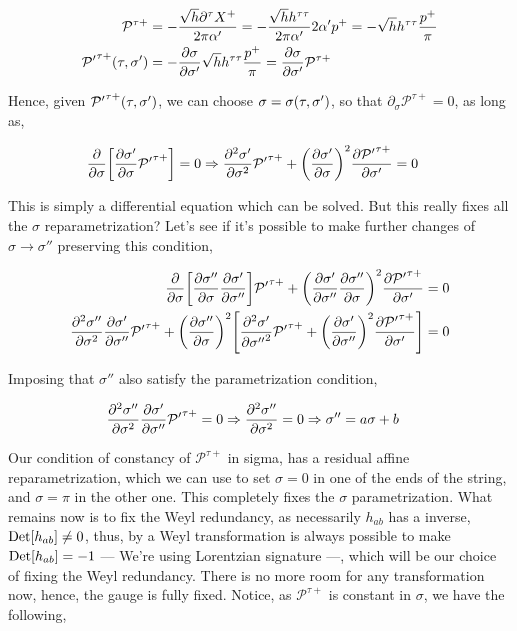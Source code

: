 \begin{align*}
    \mathcal P^{\tau+}&=-\frac{\sqrt h\partial^\tau X^+}{2\pi\alpha'}=-\frac{\sqrt h h^{\tau\tau}}{2\pi\alpha'}2\alpha'p^+=-\sqrt h h^{\tau\tau}\frac{p^+}{\pi}\\
    {\mathcal P'}^{\tau+}\qty(\tau,\sigma')&=-\pdv{\sigma}{\sigma'}\sqrt h h^{\tau\tau}\frac{p^+}{\pi}=\pdv{\sigma}{\sigma'}\mathcal P^{\tau+}
\end{align*}

Hence, given ${\mathcal P'}^{\tau+}\qty(\tau,\sigma')$, we can choose $\sigma=\sigma\qty(\tau,\sigma')$, so that $\partial_\sigma\mathcal P^{\tau+}=0$, as long as,

\begin{align*}
    \pdv{}{\sigma}\qty[{\pdv{\sigma'}{\sigma}}{\mathcal P'}^{\tau+}]&=0\Rightarrow{\pdv[2]{\sigma'}{\sigma}}{\mathcal P'}^{\tau+}+\qty(\pdv{\sigma'}{\sigma})^2\pdv{{\mathcal P'}^{\tau+}}{\sigma'}=0
\end{align*}

This is simply a differential equation which can be solved. But this really fixes all the $\sigma$ reparametrization? Let's see if it's possible to 
make further changes of $\sigma\rightarrow \sigma''$ preserving this condition,

\begin{align*}
    {\pdv{}{\sigma}}\qty[{\pdv{\sigma''}{\sigma}}{\pdv{\sigma'}{\sigma''}}]{\mathcal P'}^{\tau+}+\qty(\pdv{\sigma'}{\sigma''}\pdv{\sigma''}{\sigma})^2\pdv{{\mathcal P'}^{\tau+}}{\sigma'}&=0\\
    {\pdv[2]{\sigma''}{\sigma}}{\pdv{\sigma'}{\sigma''}}{\mathcal P'}^{\tau+}+\qty(\pdv{\sigma''}{\sigma})^2\qty[{\pdv[2]{{\sigma'}}{{\sigma''}}}{\mathcal P'}^{\tau+}
    +\qty(\pdv{\sigma'}{\sigma''})^2\pdv{{\mathcal P'}^{\tau+}}{\sigma'}
    ]&=0
\end{align*}

Imposing that $\sigma''$ also satisfy the parametrization condition,

\begin{align*}
    {\pdv[2]{\sigma''}{\sigma}}{\pdv{\sigma'}{\sigma''}}{\mathcal P'}^{\tau+}&=0\Rightarrow {\pdv[2]{\sigma''}{\sigma}}=0\Rightarrow \sigma''=a\sigma+b
\end{align*}

Our condition of constancy of $\mathcal P^{\tau+}$ in sigma, has a residual affine reparametrization, which we can use to set $\sigma=0$ in one of the ends of the 
string, and $\sigma=\pi$ in the other one. This completely fixes the $\sigma$ parametrization. What remains now is to fix the Weyl redundancy, as necessarily 
$h_{ab}$ has a inverse, $\textup{Det} \qty[h_{ab}]\neq 0$, thus, by a Weyl transformation is always possible to make $\textup{Det} \qty[h_{ab}]=-1$ --- We're using Lorentzian signature ---, which 
will be our choice of fixing the Weyl redundancy. There is 
no more room for any transformation now, hence, the gauge is fully fixed. Notice, as $\mathcal P^{\tau+}$ is constant in $\sigma$, we have the following,

